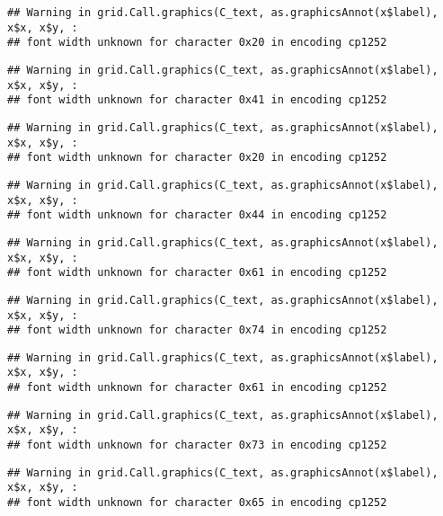 \documentclass[
]{article}
\begin{document}
\begin{verbatim}
## Warning in grid.Call.graphics(C_text, as.graphicsAnnot(x$label), x$x, x$y, :
## font width unknown for character 0x20 in encoding cp1252
\end{verbatim}

\begin{verbatim}
## Warning in grid.Call.graphics(C_text, as.graphicsAnnot(x$label), x$x, x$y, :
## font width unknown for character 0x41 in encoding cp1252
\end{verbatim}

\begin{verbatim}
## Warning in grid.Call.graphics(C_text, as.graphicsAnnot(x$label), x$x, x$y, :
## font width unknown for character 0x20 in encoding cp1252
\end{verbatim}

\begin{verbatim}
## Warning in grid.Call.graphics(C_text, as.graphicsAnnot(x$label), x$x, x$y, :
## font width unknown for character 0x44 in encoding cp1252
\end{verbatim}

\begin{verbatim}
## Warning in grid.Call.graphics(C_text, as.graphicsAnnot(x$label), x$x, x$y, :
## font width unknown for character 0x61 in encoding cp1252
\end{verbatim}

\begin{verbatim}
## Warning in grid.Call.graphics(C_text, as.graphicsAnnot(x$label), x$x, x$y, :
## font width unknown for character 0x74 in encoding cp1252
\end{verbatim}

\begin{verbatim}
## Warning in grid.Call.graphics(C_text, as.graphicsAnnot(x$label), x$x, x$y, :
## font width unknown for character 0x61 in encoding cp1252
\end{verbatim}

\begin{verbatim}
## Warning in grid.Call.graphics(C_text, as.graphicsAnnot(x$label), x$x, x$y, :
## font width unknown for character 0x73 in encoding cp1252
\end{verbatim}

\begin{verbatim}
## Warning in grid.Call.graphics(C_text, as.graphicsAnnot(x$label), x$x, x$y, :
## font width unknown for character 0x65 in encoding cp1252
\end{verbatim}
\end{document}
